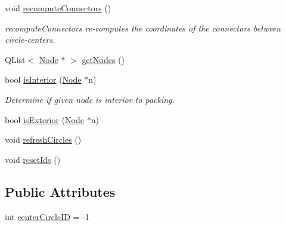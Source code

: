 \begin{DoxyCompactItemize}
void \hyperlink{class_packing_a005bd28470da94b6902d4717048e4557}{recompute\+Connectors} ()
\begin{DoxyCompactList}\small\item\em recompute\+Connectors re-\/computes the coordinates of the connectors between circle-\/centers. \end{DoxyCompactList}\item 
Q\+List$<$ \hyperlink{class_node}{Node} $\ast$ $>$ \hyperlink{class_packing_ac33b0c147d075d5b155b73dda0889a23}{get\+Nodes} ()
\item 
bool \hyperlink{class_packing_a06aed07c07ada5b34cc70907546b1e85}{is\+Interior} (\hyperlink{class_node}{Node} $\ast$n)
\begin{DoxyCompactList}\small\item\em Determine if given node is interior to packing. \end{DoxyCompactList}\item 
bool \hyperlink{class_packing_af3ac42b45e52b131f2c780db20ee3a57}{is\+Exterior} (\hyperlink{class_node}{Node} $\ast$n)
\item 
void \hyperlink{class_packing_abdb0298e456838212aae5341b395a8ef}{refresh\+Circles} ()
\item 
void \hyperlink{class_packing_a3e863b6fcd3e53f8d476a30885bc7eb2}{reset\+Ids} ()
\end{DoxyCompactItemize}
\subsection*{Public Attributes}
\begin{DoxyCompactItemize}
\item 
int \hyperlink{class_packing_ad3ad2425f1ee067444ce424702bb3976}{center\+Circle\+I\+D} = -\/1
\end{DoxyCompactItemize}
